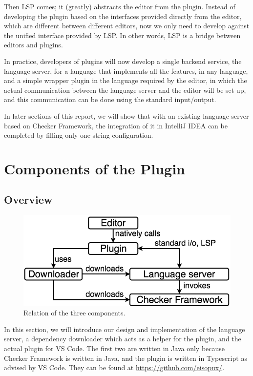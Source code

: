 \documentclass{article}
\begin{document}
Then LSP comes; it (greatly) abstracts the editor from the plugin. Instead of developing the plugin based on the interfaces provided directly from the editor, which are different between different editors, now we only need to develop against the unified interface provided by LSP. In other words, LSP is a bridge between editors and plugins.

In practice, developers of plugins will now develop a single backend service, the language server, for a language that implements all the features, in any language, and a simple wrapper plugin in the language required by the editor, in which the actual communication between the language server and the editor will be set up, and this communication can be done using the standard input/output.

In later sections of this report, we will show that with an existing language server based on Checker Framework, the integration of it in IntelliJ IDEA can be completed by filling only one string configuration.

\section{Components of the Plugin}

\subsection{Overview}

\begin{figure}[ht]
\centering
\includegraphics[scale=0.3]{relation.png}
\caption{Relation of the three components.}
\label{fig:components-relation}
\end{figure}

In this section, we will introduce our design and implementation of the language server, a dependency downloader which acts as a helper for the plugin, and the actual plugin for VS Code. The first two are written in Java only because Checker Framework is written in Java, and the plugin is written in Typescript as advised by VS Code. They can be found at \url{https://github.com/eisopux/}.
\end{document}
